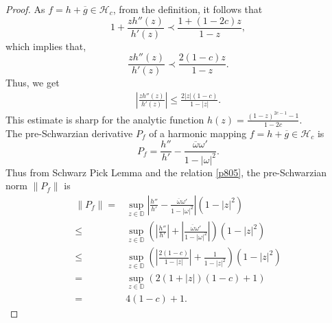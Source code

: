 \documentclass[10pt,a4paper]{amsart}
\begin{document}
	\begin{proof}
		As $f=h+\overline{g}\in\mathcal{H}_c$, from the definition, it follows that
		$$1+\frac{zh''(z)}{h'(z)}\prec\frac{1+(1-2c)z}{1-z},$$ which implies that,
		$$\frac{zh''(z)}{h'(z)}\prec\frac{2(1-c)z}{1-z}.$$ Thus, we get
		\begin{align}\label{p805}
			\left|\frac{zh''(z)}{h'(z)}\right|\le \frac{2|z|(1-c)}{1-|z|}.
		\end{align}
		This estimate is sharp for the analytic function $h(z)=\frac{(1-z)^{2c-1}-1}{1-2c}.$\\
		
		The pre-Schwarzian derivative $P_f$ of a harmonic mapping $f=h+\overline{g}\in\mathcal{H}_c$ is 
		$$
			P_f=\frac{h''}{h'}-\frac{\overline{\omega}\omega'}{1-|\omega|^2}.
		$$
		Thus from Schwarz Pick Lemma and the relation \eqref{p805}, the pre-Schwarzian norm $\|P_f\|$ is 
		\begin{align}\label{HM-100}
			\|P_f\|= & \sup_{z \in \mathbb{D}}\left|\frac{h''}{h'}-\frac{\overline{\omega}\omega'}{1-|\omega|^2}\right|(1-|z|^2)\\\nonumber
			\le & \sup_{z \in \mathbb{D}}\left(\left|\frac{h''}{h'}\right|+\left|\frac{\overline{\omega}\omega'}{1-|\omega|^2}\right|\right)(1-|z|^2)\\\nonumber
			\le & \sup_{z \in \mathbb{D}}\left(\left|\frac{2(1-c)}{1-|z|}\right|+\frac{1}{1-|z|^2}\right)(1-|z|^2)\\\nonumber
			=& \sup_{z \in \mathbb{D}}\left(2(1+|z|)(1-c)+1\right)\\\nonumber
			=& 4(1-c)+1.
		\end{align}
		

\end{proof}
\end{document}
